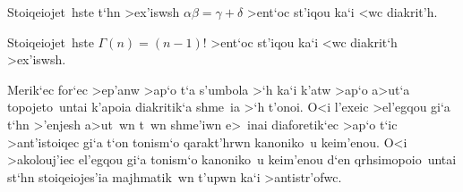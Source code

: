 
\exercise Stoiqeiojet~hste t`hn >ex'iswsh $\alpha\beta=\gamma+\delta$
>ent`oc st'iqou ka`i <wc diakrit'h.

\exercise Stoiqeiojet~hste $\Gamma(n) = (n-1)!$ >ent`oc st'iqou ka`i
<wc diakrit`h >ex'iswsh.

Merik`ec for`ec >ep'anw >ap`o t`a s'umbola >`h ka`i k'atw >ap`o a>ut`a
topojeto~untai k'apoia diakritik`a shme~ia >`h t'onoi.  O<i l'exeic
>el'egqou gi`a t`hn >'enjesh a>ut~wn t~wn shme'iwn e>~inai diaforetik`ec
>ap`o t`ic >ant'istoiqec gi`a t`on tonism`o qarakt'hrwn kanoniko~u
keim'enou.  O<i >akolouj'iec el'egqou gi`a tonism`o kanoniko~u keim'enou
d`en qrhsimopoio~untai st`hn stoiqeiojes'ia majhmatik~wn t'upwn ka`i
>antistr'ofwc.%



